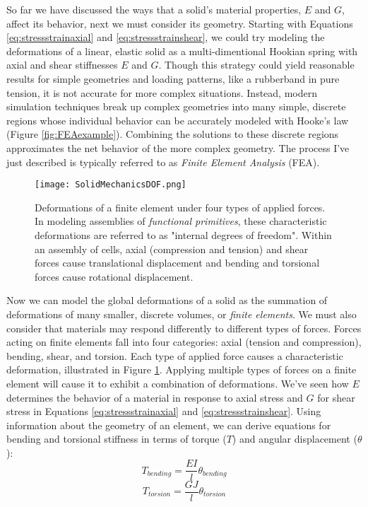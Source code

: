 {So far we have discussed the ways that a solid's material properties, $E$ and $G$, affect its behavior, next we must consider its geometry.  Starting with Equations \ref{eq:stressstrainaxial} and  \ref{eq:stressstrainshear}, we could try modeling the deformations of a linear, elastic solid as a multi-dimentional Hookian spring with axial and shear stiffnesses $E$ and $G$.  Though this strategy could yield reasonable results for simple geometries and loading patterns, like a rubberband in pure tension, it is not accurate for more complex situations.  Instead, modern simulation techniques break up complex geometries into many simple, discrete regions whose individual behavior can be accurately modeled with Hooke's law (Figure \ref{fig:FEAexample}).  Combining the solutions to these discrete regions approximates the net behavior of the more complex geometry.  The process I've just described is typically referred to as \textit{Finite Element Analysis} (FEA).\\

\begin{figure}
  \texttt{[image: SolidMechanicsDOF.png]}
  \caption{Deformations of a finite element under four types of applied forces.  In modeling assemblies of \textit{functional primitives}, these characteristic deformations are referred to as "internal degrees of freedom".  Within an assembly of cells, axial (compression and tension) and shear forces cause translational displacement and bending and torsional forces cause rotational displacement.}
  \label{fig:SolidMechanicsDOF}
\end{figure}

Now we can model the global deformations of a solid as the summation of deformations of many smaller, discrete volumes, or \textit{finite elements}.  We must also consider that materials may respond differently to different types of forces.  Forces acting on finite elements fall into four categories: axial (tension and compression), bending, shear, and torsion.  Each type of applied force causes a characteristic deformation, illustrated in Figure \ref{fig:SolidMechanicsDOF}.  Applying multiple types of forces on a finite element will cause it to exhibit a combination of deformations.  We've seen how $E$ determines the behavior of a material in response to axial stress and $G$ for shear stress in Equations \ref{eq:stressstrainaxial} and  \ref{eq:stressstrainshear}.  Using information about the geometry of an element, we can derive equations for bending and torsional stiffness in terms of torque ($T$) and angular displacement ($\theta$):
\begin{equation}\label{eq:stressstrainbending}
T_{bending} = \dfrac{EI}{l}\theta_{bending} 
\end{equation}
\begin{equation}\label{eq:stressstraintorsion}
T_{torsion} = \dfrac{GJ}{l}\theta_{torsion} 
\end{equation}

}
